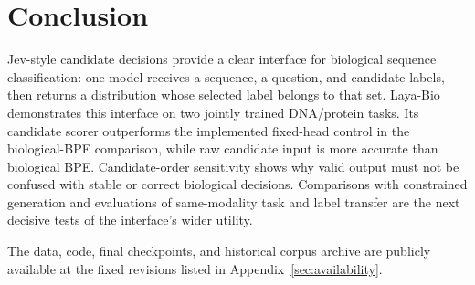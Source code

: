 \section{Conclusion}
Jev-style candidate decisions provide a clear interface for biological sequence classification: one model receives a sequence, a question, and candidate labels, then returns a distribution whose selected label belongs to that set. Laya-Bio demonstrates this interface on two jointly trained DNA/protein tasks. Its candidate scorer outperforms the implemented fixed-head control in the biological-BPE comparison, while raw candidate input is more accurate than biological BPE. Candidate-order sensitivity shows why valid output must not be confused with stable or correct biological decisions. Comparisons with constrained generation and evaluations of same-modality task and label transfer are the next decisive tests of the interface's wider utility.

The data, code, final checkpoints, and historical corpus archive are publicly available at the fixed revisions listed in Appendix~\ref{sec:availability}.
